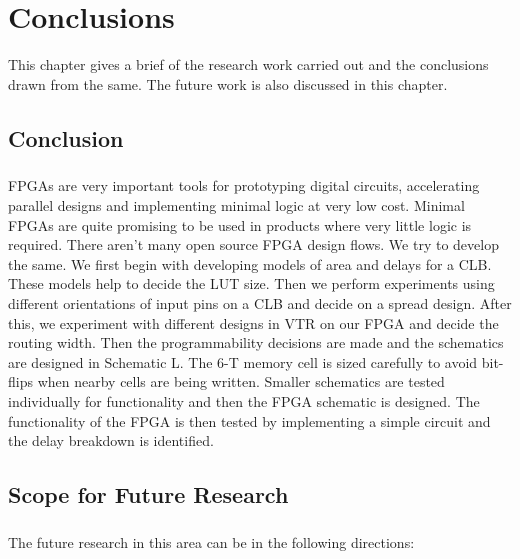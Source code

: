 %
%
\let\textcircled=\pgftextcircled
\chapter{Conclusions}
\label{chap:conclusion}

This chapter gives a brief of the research work carried out and the conclusions drawn from the same. The future work is also discussed in this chapter.

\section{Conclusion}
\paragraph{}

FPGAs are very important tools for prototyping digital circuits, accelerating parallel designs and implementing minimal logic at very low cost. Minimal FPGAs are quite promising to be used in products where very little logic is required. There aren't many open source FPGA design flows. We try to develop the same. We first begin with developing models of area and delays for a CLB. These models help to decide the LUT size. Then we perform experiments using different orientations of input pins on a CLB and decide on a spread design. After this, we experiment with different designs in VTR on our FPGA and decide the routing width. Then the programmability decisions are made and the schematics are designed in Schematic L. The 6-T memory cell is sized carefully to avoid bit-flips when nearby cells are being written. Smaller schematics are tested individually for functionality and then the FPGA schematic is designed. The functionality of the FPGA is then tested by implementing a simple circuit and the delay breakdown is identified. 
 
\section{Scope for Future Research}
\paragraph{}

The future research in this area can be in the following directions:

